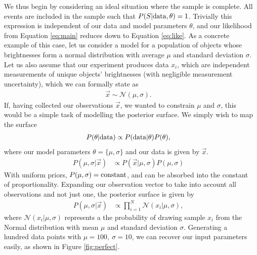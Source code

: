 \documentclass[a4paper,fleqn,usenatbib]{mnras}
\begin{document}
We thus begin by considering an ideal situation where the sample is complete.  All events are included in the sample such that $P(S | {\rm data}, \theta)=1$.  Trivially this expression is independent of our data and model parameters $\theta$, and our likelihood from Equation \eqref{eq:main} reduces down to Equation \eqref{eq:like}. As a concrete example of this case, let us consider a model for a population of objects whose brightnesses form a normal distribution with average $\mu$ and standard deviation $\sigma$. Let us also assume that our experiment produces data $x_i$, which are independent measurements of unique objects' brightnesses (with negligible measurement uncertainty), which we can formally state as
\begin{align}
\vec{x} \sim \mathcal{N}(\mu,\sigma).
\end{align}
If, having collected our observations $\vec{x}$, we wanted to constrain $\mu$ and $\sigma$, this would be a simple task of modelling the posterior surface. We simply wish to map the surface
\begin{align}
P(\theta | {\rm data}) \propto P({\rm data} | \theta) P(\theta),
\end{align}
where our model parameters $\theta = \lbrace \mu, \sigma \rbrace$ and our data is given by $\vec{x}$.
\begin{align}
P(\mu,\sigma| \vec{x}) &\propto P(\vec{x} | \mu, \sigma) P(\mu, \sigma)
\end{align}
With uniform priors, $P(\mu,\sigma) = {\rm constant}$, and can be absorbed into the constant of proportionality. Expanding our observation vector to take into account all observations and not just one, the posterior surface is given by
\begin{align}
P(\mu,\sigma| \vec{x}) &\propto \prod_{i=1}^N \mathcal{N}(x_i | \mu, \sigma), \label{eq:prod}
\end{align}
where $\mathcal{N}(x_i|\mu,\sigma)$ represents a the probability of drawing sample $x_i$ from the Normal distribution with mean $\mu$ and standard deviation $\sigma$. Generating a hundred data points with $\mu=100,\ \sigma=10$, we can recover our input parameters easily, as shown in Figure \ref{fig:perfect}.
\end{document}
